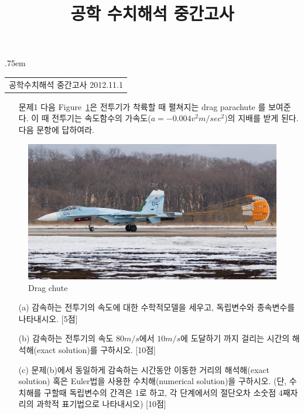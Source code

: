 \documentclass[a4,10pt]{article}
\title{공학 수치해석 중간고사}
\author{}
\makeatletter
\theoremstyle{examplestyle}
\renewcommand{\tableofcontents}[1][\contentsname]{%
  \section*{#1}
  \begin{multicols}{2}
    \@starttoc{toc}
  \end{multicols}
}
\makeatother
\begin{document}
\begin{center}
{\lineskip .75em\begin{tabular}[t]{c}\LARGE{공학수치해석 중간고사} \large{2012.11.1}\end{tabular}\par}%
\end{center}

\begin{itemize}
\item[문제1] 다음 Figure~\ref{fig:e1}은 전투기가 착륙할 때 펼쳐지는 drag parachute 를 보여준다. 이 때 전투기는 속도함수의 가속도($a=-0.004v^2 m/sec^2$)의 지배를 받게 된다. 다음 문항에 답하여라.
\end{itemize}
\begin{figure}[!hbpt]
\centering
\includegraphics[keepaspectratio=true,width=0.6\linewidth]{midterm/dragchute.eps}
\caption{Drag chute}
\label{fig:e1}
\end{figure}
\begin{itemize}
\item[(a)] 감속하는 전투기의 속도에 대한 수학적모델을 세우고, 독립변수와 종속변수를 나타내시오. [5점]
\item[(b)] 감속하는 전투기의 속도 $80m/s$에서 $10m/s$에 도달하기 까지 걸리는 시간의 해석해(exact solution)를 구하시오. [10점]
\item[(c)] 문제(b)에서 동일하게 감속하는 시간동안 이동한 거리의 해석해(exact solution) 혹은 Euler법을 사용한 수치해(numerical solution)을 구하시오. (단, 수치해를 구할때 독립변수의 간격은 1로 하고, 각 단계에서의 절단오차 소숫점 4째자리의 과학적 표기법으로 나타내시오) [10점]
\end{itemize}
\end{document}
